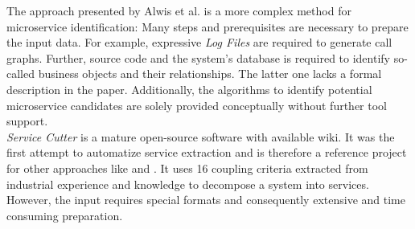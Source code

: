 The approach presented by Alwis et al. \cite{HeuristicsAlwis} is a more complex method for microservice identification: Many steps and 
prerequisites are necessary to prepare the input data. For example, expressive \textit{Log Files} are required to generate call graphs. Further, source code and the system's database is required to identify so-called business objects and their relationships. The latter one lacks a formal description in the paper. 
Additionally, the algorithms to identify potential microservice candidates are solely provided conceptually without further tool support. \\

\textit{Service Cutter} \cite{ServiceCutter} is a mature open-source software with available wiki. It was the first attempt to automatize service extraction and is therefore a reference project for other approaches like \cite{ExtractionMazlami} and \cite{DataflowDrivenChen}. It uses 16 coupling criteria extracted from industrial experience and knowledge to decompose a system into services. However, the input requires special formats and consequently extensive and time consuming preparation.








